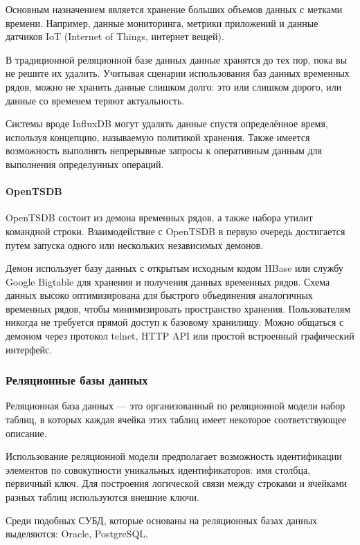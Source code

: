 Основным назначением является хранение больших объемов данных с метками времени. Например, данные мониторинга, метрики приложений и данные датчиков IoT (Internet of Things, интернет вещей).

В традиционной реляционной базе данных данные хранятся до тех пор, пока вы не решите их удалить. Учитывая сценарии использования баз данных временных рядов, можно не хранить данные слишком долго: это или слишком дорого, или данные со временем теряют актуальность. \cite{ryadi}

Системы вроде InfluxDB могут удалять данные спустя определённое время, используя концепцию, называемую политикой хранения. Также имеется возможность выполнять непрерывные запросы к оперативным данным для выполнения определунных операций. \cite{ryadi}

\paragraph{OpenTSDB}
OpenTSDB состоит из демона временных рядов, а также набора утилит командной строки. Взаимодействие с OpenTSDB в первую очередь достигается путем запуска одного или нескольких независимых демонов.

Демон использует базу данных с открытым исходным кодом HBase или службу Google Bigtable для хранения и получения данных временных рядов. Схема данных высоко оптимизирована для быстрого объединения аналогичных временных рядов, чтобы минимизировать пространство хранения. Пользователям никогда не требуется прямой доступ к базовому хранилищу. Можно общаться с демоном через протокол telnet, HTTP API или простой встроенный графический интерфейс.

\subsubsection{Реляционные базы данных}
Реляционная база данных --- это организованный по реляционной модели набор таблиц, в которых каждая ячейка этих таблиц имеет некоторое соответствующее описание. \cite{relationki}

Использование реляционной модели предполагает возможность идентификации элементов по совокупности уникальных идентификаторов: имя столбца, первичный ключ. Для построения логической связи между строками и ячейками разных таблиц используются внешние ключи. \cite{relationki}

Среди подобных СУБД, которые основаны на реляционных базах данных выделяются: Oracle, PostgreSQL.

